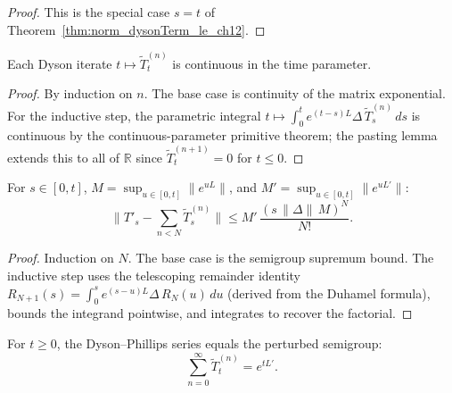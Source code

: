 \begin{proof}
    \leanok
    This is the special case $s=t$ of Theorem~\ref{thm:norm_dysonTerm_le_ch12}.
\end{proof}

\begin{theorem}
    \label{thm:dysonTerm_continuous_ch12}
    \leanok
    Each Dyson iterate $t \mapsto \widetilde{T}^{(n)}_t$ is continuous
    in the time parameter.
\end{theorem}

\begin{proof}
    \leanok
    By induction on $n$. The base case is continuity of the matrix
    exponential. For the inductive step, the parametric integral
    $t\mapsto \int_0^t e^{(t-s)L} \Delta\,\widetilde{T}^{(n)}_s\,ds$
    is continuous by the continuous-parameter primitive theorem;
    the pasting lemma extends this to all of $\mathbb{R}$ since
    $\widetilde{T}^{(n+1)}_t = 0$ for $t \le 0$.
\end{proof}

\begin{theorem}
    \label{thm:norm_dysonRemainder_le_ch12}
    \leanok
    For $s \in [0,t]$, $M = \sup_{u \in [0,t]}\|e^{uL}\|$,
    and $M' = \sup_{u \in [0,t]}\|e^{uL'}\|$:
    \[
        \bigl\|T'_s - \textstyle\sum_{n < N}\widetilde{T}^{(n)}_s\bigr\|
        \le M'\,\frac{(s\,\|\Delta\|\,M)^N}{N!}.
    \]
\end{theorem}

\begin{proof}
    \leanok
    Induction on $N$. The base case is the semigroup supremum bound.
    The inductive step uses the telescoping remainder identity
    $R_{N+1}(s) = \int_0^s e^{(s-u)L} \Delta\,R_N(u)\,du$
    (derived from the Duhamel formula), bounds the integrand
    pointwise, and integrates to recover the factorial.
\end{proof}

\begin{theorem}
    \label{thm:dyson_series_eq_ch12}
    \leanok
    For $t \ge 0$, the Dyson--Phillips series equals the perturbed
    semigroup:
    \[
        \sum_{n=0}^{\infty} \widetilde{T}^{(n)}_t = e^{tL'}.
    \]
\end{theorem}

